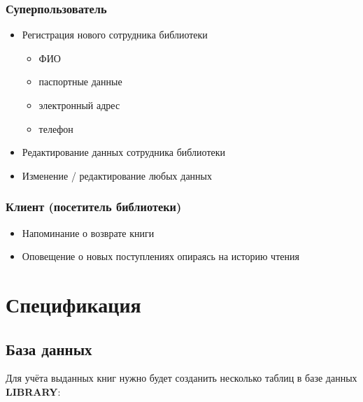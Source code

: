 \documentclass[a4paper,10pt]{article}
\begin{document}
            \newpage


            \subsubsection{Суперпользователь}

                \begin{itemize}
                    \item Регистрация нового сотрудника библиотеки
                        \begin{itemize}
                            \item ФИО
                            \item паспортные данные
                            \item электронный адрес
                            \item телефон
                        \end{itemize}
                    \item Редактирование данных сотрудника библиотеки
                    \item Изменение / редактирование любых данных
                \end{itemize}


            \subsubsection{Клиент (посетитель библиотеки)}

                \begin{itemize}
                    \item Напоминание о возврате книги
                    \item Оповещение о новых поступлениях опираясь на историю чтения
                \end{itemize}


    \newpage


    \section{Спецификация}

        \subsection{База данных}

            Для учёта выданных книг нужно будет созданить несколько таблиц в базе данных \textbf{LIBRARY}:
\end{document}
